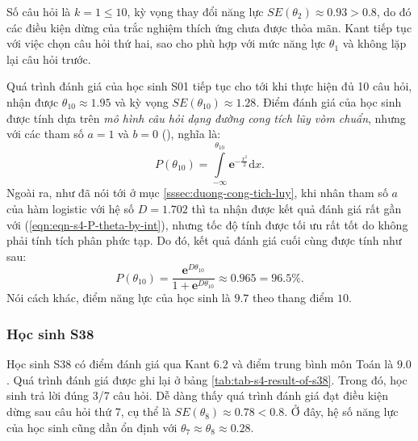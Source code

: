 Số câu hỏi là $k=1\leqslant 10$, kỳ vọng thay đổi năng lực $SE(\theta_2)\approx 0.93>0.8$, do đó các điều kiện dừng của trắc nghiệm thích ứng chưa được thỏa mãn. Kant tiếp tục với việc chọn câu hỏi thứ hai, sao cho phù hợp với mức năng lực $\theta_1$ và không lặp lại câu hỏi trước.\par
Quá trình đánh giá của học sinh S01 tiếp tục cho tới khi thực hiện đủ 10 câu hỏi, nhận được $\theta_{10}\approx 1.95$ và kỳ vọng $SE(\theta_{10})\approx 1.28$. Điểm đánh giá của học sinh được tính dựa trên \textit{mô hình câu hỏi dạng đường cong tích lũy vòm chuẩn}, nhưng với các tham số $a=1$ và $b=0$ (\cite{le2019phat}), nghĩa là: \begin{equation}\label{eqn:eqn-s4-P-theta-by-int}P(\theta_{10})=\int\limits_{-\infty}^{\theta_{10}}\mathbf{e}^{-\frac{x^2}{2}}\mathrm{d}x.\end{equation}
Ngoài ra, như đã nói tới ở mục \ref{sssec:duong-cong-tich-luy}, khi nhân tham số $a$ của hàm logistic với hệ số $D=1.702$ thì ta nhận được kết quả đánh giá rất gần với (\ref{eqn:eqn-s4-P-theta-by-int}), nhưng tốc độ tính được tối ưu rất tốt do không phải tính tích phân phức tạp. Do đó, kết quả đánh giá cuối cùng được tính như sau: $$P(\theta_{10})=\frac{\mathbf{e}^{D\theta_{10}}}{1+\mathbf{e}^{D\theta_{10}}}\approx 0.965=96.5\%.$$
Nói cách khác, điểm năng lực của học sinh là $9.7$ theo thang điểm $10$.

\subsubsection{Học sinh S38}

Học sinh S38 có điểm đánh giá qua Kant $6.2$ và điểm trung bình môn Toán là $9.0$. Quá trình đánh giá được ghi lại ở bảng \ref{tab:tab-s4-result-of-s38}. Trong đó, học sinh trả lời đúng 3/7 câu hỏi. Dễ dàng thấy quá trình đánh giá đạt điều kiện dừng sau câu hỏi thứ 7, cụ thể là $SE(\theta_8)\approx 0.78<0.8$. Ở đây, hệ số năng lực của học sinh cũng dần ổn định với $\theta_7\approx\theta_8\approx 0.28$.

